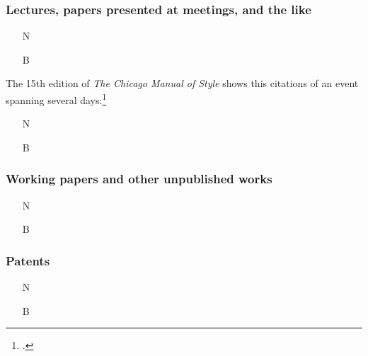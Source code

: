 \documentclass[11pt,letterpaper,oneside]{article}
\begin{document}
\setcounter{subsubsection}{225}
\subsubsection{Lectures, papers presented at meetings, and the like}

\begin{itemize}
\item[N] 

\item[B] 
\end{itemize}

\noindent The 15th edition of \textit{The Chicago Manual of Style}
shows this citations of an event spanning several
days:\footcite[17.215]{chicago2003}

\begin{itemize}
\item[N] 

\item[B] 
\end{itemize}

\setcounter{subsubsection}{227}
\subsubsection{Working papers and other unpublished works}

\begin{itemize}
\item[N] 

\item[B] 
\end{itemize}

\setcounter{subsubsection}{229}
\subsubsection{Patents}

\begin{itemize}
\item[N] 

\item[B] 
\end{itemize}

\end{document}
